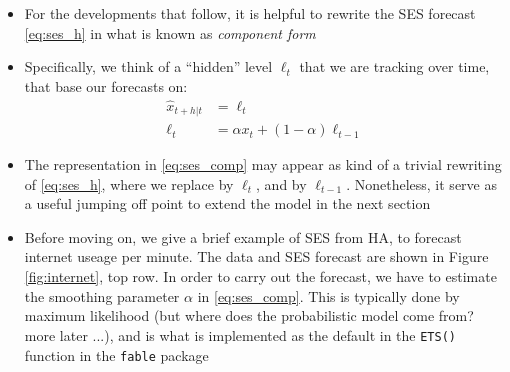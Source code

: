 \documentclass{article}
\begin{document}
\begin{itemize}
\item For the developments that follow, it is helpful to rewrite the SES forecast
  \eqref{eq:ses_h} in what is known as \emph{component form}

\item Specifically, we think of a ``hidden'' level $\ell_t$ that we are tracking
  over time, that base our forecasts on:
  \begin{equation}
  \label{eq:ses_comp}
  \begin{aligned}
  \hat{x}_{t+h | t} &= \ell_t \\
  \ell_t &= \alpha x_t + (1-\alpha) \ell_{t-1}
  \end{aligned}
  \end{equation}

\item The representation in \eqref{eq:ses_comp} may appear as kind of a trivial
  rewriting of \eqref{eq:ses_h}, where we replace 
  by $\ell_t$, and  by $\ell_{t-1}$. Nonetheless, it
  serve as a useful jumping off point to extend the model in the next section    

\item Before moving on, we give a brief example of SES from HA, to forecast
  internet useage per minute. The data and SES forecast are shown in Figure
  \ref{fig:internet}, top row. In order to carry out the forecast, we have to
  estimate the smoothing parameter $\alpha$ in \eqref{eq:ses_comp}. This is
  typically done by maximum likelihood (but where does the probabilistic model
  come from? more later ...), and is what is implemented as the default in the 
  \verb|ETS()| function in the \verb|fable| package  


\end{itemize}
\end{document}
